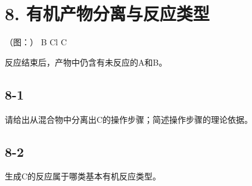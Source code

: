 \section*{8. 有机产物分离与反应类型}
（图：）
B
Cl
C

反应结束后，产物中仍含有未反应的A和B。

\subsection*{8-1}
请给出从混合物中分离出C的操作步骤；简述操作步骤的理论依据。

\subsection*{8-2}
⽣成C的反应属于哪类基本有机反应类型。
